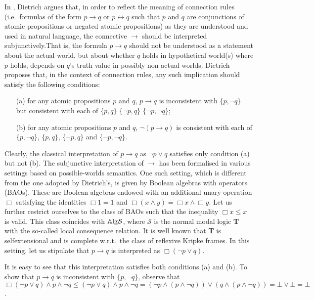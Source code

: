 \documentclass{llncs}
\numberwithin{equation}{section}
\newcommand{\SSS}{\mathcal{S}}
\begin{document}
In \cite{Di10}, Dietrich argues that, in order to reflect the meaning of connection rules (i.e.\  formulas of the form $p\rightarrow q$ or $p\leftrightarrow q $ such that $p$ and $q$ are conjunctions of atomic propositions or negated atomic propositions) as they are understood and used in natural language, the connective $\rightarrow$ should be interpreted subjunctively.That is, the formula $p\rightarrow q$ should not be understood as a statement about the actual
world, but about whether $q$ holds in hypothetical world(s) where $p$ holds,  depends on $q$'s truth value in possibly non-actual worlds.
Dietrich proposes that, in the context of connection rules, any such implication should satisfy the following conditions:
\begin{itemize}
\item[(a)] for any atomic propositions $p$ and $q$,  $p \rightarrow q$ is inconsistent
with $\{p, \neg q\}$ but consistent with each of  $\{p, q\}$  $\{\neg p, q\}$  $\{\neg p, \neg q\}$;

\item[(b)] for any  atomic propositions $p$ and $q$,  $\neg(p \rightarrow q)$ is consistent with each of $\{p, \neg q\}$,  $\{p, q\}$,  $\{\neg p, q\}$ and  $\{\neg p, \neg q\}$.
\end{itemize}
Clearly, the classical interpretation of $p\rightarrow q$ as $\neg p\vee q$ satisfies only condition (a) but not (b).  The subjunctive interpretation of $\rightarrow$ has been formalised in various settings based on possible-worlds semantics. One such setting, which is different from the one adopted by Dietrich's, is given by Boolean algebras with operators (BAOs). These are Boolean algebras endowed with an additional unary operation $\Box$ satisfying the identities $\Box 1 = 1$ and $\Box(x\wedge y) = \Box x\wedge \Box y$. Let us further restrict ourselves to the class of BAOs such that the inequality $\Box x\leq x$ is valid. This class coincides with $\Alg\SSS$, where $\SSS$ is the normal modal logic {\bf T} with the so-called local consequence relation. It is well known that {\bf T} is selfextensional and is complete w.r.t.\ the class of reflexive Kripke frames.  In this setting, let us stipulate that $p\rightarrow q$ is interpreted as $\Box(\neg p\vee q)$. 

It is easy to see that this interpretation satisfies both conditions (a) and (b).
To show that $p\rightarrow q$ is inconsistent with $\{p,\neg q\}$, observe that $\Box(\neg p\vee q)\wedge p\wedge \neg q\leq (\neg p\vee q)\wedge p\wedge \neg q = (\neg p\wedge (p\wedge \neg q))\vee (q\wedge (p\wedge \neg q))=\bot\vee\bot=\bot$. 
\end{document}
